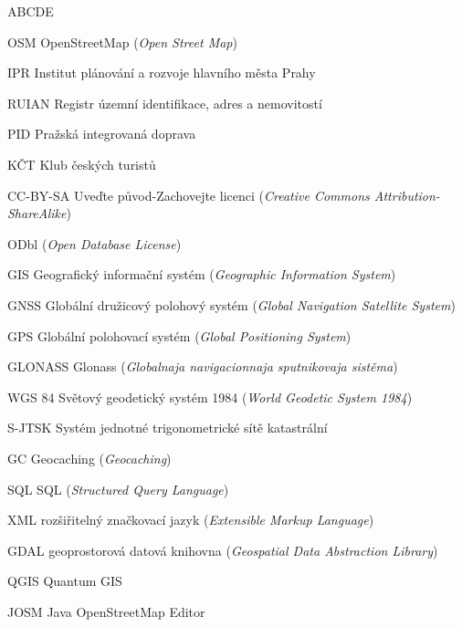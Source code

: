 \begin{seznamzkratek}{ABCDE}

		{OSM}
		{OpenStreetMap (\textit{Open Street Map})}

	    {IPR}
        {Institut plánování a rozvoje hlavního města Prahy}

	    {RUIAN}
        {Registr územní identifikace, adres a nemovitostí}

	    {PID}
        {Pražská integrovaná doprava}

	    {KČT}
        {Klub českých turistů}

		{CC-BY-SA}
		{Uveďte původ-Zachovejte licenci (\textit{Creative Commons Attribution-ShareAlike})}

		{ODbl}
		{(\textit{Open Database License})}

	      {GIS}
 	      {Geografický informační systém  (\textit{Geographic Information System})}

		{GNSS}
		{Globální družicový polohový systém (\textit{Global Navigation Satellite System})}

		{GPS}
		{Globální polohovací systém (\textit{Global Positioning System})}

		{GLONASS}
		{Glonass (\textit{Globalnaja navigacionnaja sputnikovaja sistěma})}

		{WGS 84}
		{Světový geodetický systém 1984 (\textit{World Geodetic System 1984})}

		{S-JTSK}
		{Systém jednotné trigonometrické sítě katastrální}

		{GC}
		{Geocaching (\textit{Geocaching})}

		{SQL}
		{SQL (\textit{Structured Query Language})}

		{XML}
		{rozšiřitelný značkovací jazyk (\textit{Extensible Markup Language})}

		{GDAL}
		{geoprostorová datová knihovna (\textit{Geospatial Data Abstraction Library})}

        {QGIS}
        {Quantum GIS}

        {JOSM}
        {Java OpenStreetMap Editor}


\end{seznamzkratek}
